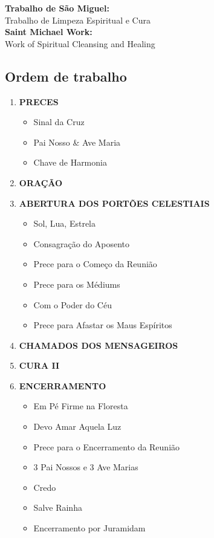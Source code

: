 %


{ %


\scleardpage

\begin{center}
  \large
  \textbf{Trabalho de São Miguel:}\\
  Trabalho de Limpeza Espiritual e Cura\\
  \vspace{2ex}
  \textbf{Saint Michael Work:}\\
  Work of Spiritual Cleansing and Healing
\end{center}

\subsection*{Ordem de trabalho}

\begin{enumerate}
  \item \MakeUppercase{\textbf{Preces}}
    \begin{itemize}
      \item Sinal da Cruz
      \item Pai Nosso \& Ave Maria
      \item Chave de Harmonia
    \end{itemize}
  \item \MakeUppercase{\textbf{Oração}}
  \item \MakeUppercase{\textbf{Abertura dos portões celestiais}}
    \begin{itemize}
      \item Sol, Lua, Estrela
      \item Consagração do Aposento
      \item Prece para o Começo da Reunião
      \item Prece para os Médiums
      \item Com o Poder do Céu
      \item Prece para Afastar os Maus Espíritos
    \end{itemize}
  \item \MakeUppercase{\textbf{Chamados dos Mensageiros}}
  \item \MakeUppercase{\textbf{Cura II}}
  \item \MakeUppercase{\textbf{Encerramento}}
    \begin{itemize}
      \item Em Pé Firme na Floresta
      \item Devo Amar Aquela Luz
      \item Prece para o Encerramento da Reunião
      \item 3 Pai Nossos e 3 Ave Marias
      \item Credo
      \item Salve Rainha
      \item Encerramento por Juramidam
    \end{itemize}
\end{enumerate}

}
